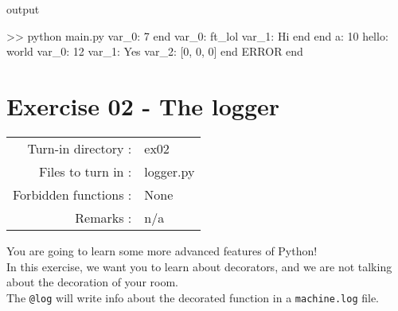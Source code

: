 \documentclass[]{article}
\newenvironment{Shaded}{\begin{snugshade}}{\end{snugshade}}
\newcommand{\NormalTok}[1]{\textcolor[rgb]{0.81,0.81,0.76}{#1}}
\begin{document}
output

\begin{Shaded}
\begin{Highlighting}[]
\NormalTok{>> python main.py}
\NormalTok{var_0: 7}
\NormalTok{end}
\NormalTok{var_0: ft_lol}
\NormalTok{var_1: Hi}
\NormalTok{end}
\NormalTok{end}
\NormalTok{a: 10}
\NormalTok{hello: world}
\NormalTok{var_0: 12}
\NormalTok{var_1: Yes}
\NormalTok{var_2: [0, 0, 0]}
\NormalTok{end}
\NormalTok{ERROR}
\NormalTok{end}
\end{Highlighting}
\end{Shaded}

\clearpage

\hypertarget{exercise-02---the-logger-1}{%
\section{Exercise 02 - The logger}\label{exercise-02---the-logger-1}}

\begin{longtable}[]{@{}rl@{}}
\toprule
\endhead
Turn-in directory : & ex02\tabularnewline
Files to turn in : & logger.py\tabularnewline
Forbidden functions : & None\tabularnewline
Remarks : & n/a\tabularnewline
\bottomrule
\end{longtable}

You are going to learn some more advanced features of Python!\\
In this exercise, we want you to learn about decorators, and we are not
talking about the decoration of your room.\\
The \texttt{@log} will write info about the decorated function in a
\texttt{machine.log} file.
\end{document}
